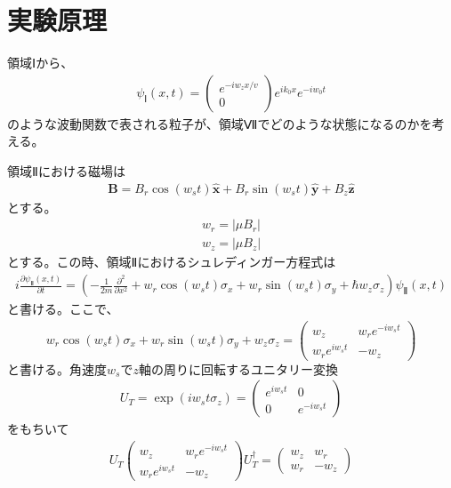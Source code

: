 \def\vector#1{\mbox{\boldmath $#1$}}
\section{実験原理}
領域Ⅰから、
\begin{align}
{\psi}_{Ⅰ}(x,t)=
\begin{pmatrix}
e^{-iw_{z}x/v} \\
0
\end{pmatrix}
e^{ik_{0}x}e^{-iw_{0}t}
\end{align}
のような波動関数で表される粒子が、領域Ⅶでどのような状態になるのかを考える。

領域Ⅱにおける磁場は
\begin{align}
\bm{B}=B_{r}\cos(w_{s}t)\bm{\hat{x}}+B_{r}\sin(w_{s}t)\bm{\hat{y}}+B_{z}\bm{\hat{z}}
\end{align}
とする。
\begin{align}
w_{r}=|{\mu}B_{r}|
\end{align}
\begin{align}
w_{z}=|{\mu}B_{z}|
\end{align}
とする。この時、領域Ⅱにおけるシュレディンガー方程式は
\begin{align}
i\frac{\partial {\psi}_{Ⅱ}(x,t)}{\partial t}=\left(-\frac{1}{2m}\frac{\partial^2}{\partial x^2}+w_{r}\cos(w_{s}t){\sigma}_{x}+w_{r}\sin(w_{s}t){\sigma}_{y}+{\hbar}w_{z}{\sigma}_{z}\right){\psi}_{Ⅱ}(x,t)
\end{align}
と書ける。ここで、
\begin{align}
w_{r}\cos(w_{s}t){\sigma}_{x}+w_{r}\sin(w_{s}t){\sigma}_{y}+w_{z}{\sigma}_{z}=
\begin{pmatrix}
w_{z} &w_{r}e^{-iw_{s}t} \\
w_{r}e^{iw_{s}t} &-w_{z}
\end{pmatrix}
\end{align}
$と書ける。角速度w_{s}でz軸の周りに回転するユニタリー変換$
\begin{align}
U_{T}=\exp(iw_{s}t{\sigma}_{z})=
\begin{pmatrix}
e^{iw_{s}t} &0 \\
0 &e^{-iw_{s}t}
\end{pmatrix}
\end{align}
をもちいて
\begin{align}
U_{T}\begin{pmatrix}
w_{z} &w_{r}e^{-iw_{s}t} \\
w_{r}e^{iw_{s}t} &-w_{z}
\end{pmatrix}U_{T}^{\dagger}=
\begin{pmatrix}
w_{z} &w_{r} \\
w_{r} &-w_{z}
\end{pmatrix}
\end{align}

